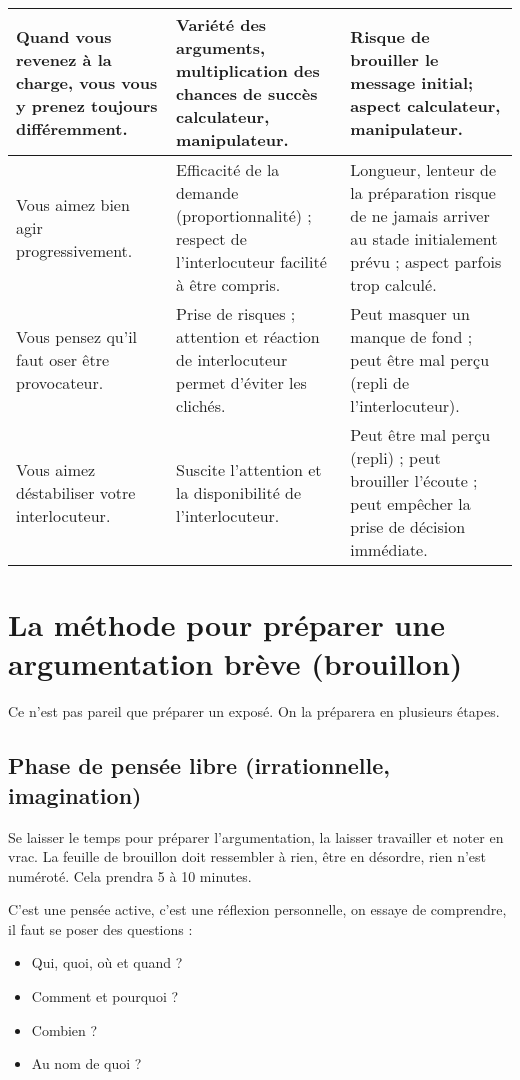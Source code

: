 \documentclass[final, a4paper, 11pt]{article}
\begin{document}
\begin{tabular}{|p{4cm}|p{6cm}|p{6cm}|}
Quand vous revenez à la charge, vous vous y prenez toujours différemment.
& Variété des arguments, multiplication des chances de succès calculateur, manipulateur.
& Risque de brouiller le message initial; aspect calculateur, manipulateur.
\\\hline

Vous aimez bien agir progressivement. 
& Efficacité de la demande (proportionnalité) ; respect de l'interlocuteur facilité à être compris.
& Longueur, lenteur de la préparation risque de ne jamais arriver au stade initialement prévu ; aspect parfois trop calculé.
\\\hline

Vous pensez qu'il faut oser être provocateur.
& Prise de risques ; attention et réaction de interlocuteur permet d'éviter les clichés.
& Peut masquer un manque de fond ; peut être mal perçu (repli de l'interlocuteur).
\\\hline

Vous aimez déstabiliser votre interlocuteur.
& Suscite l'attention et la disponibilité de l'interlocuteur.
& Peut être mal perçu (repli) ; peut brouiller l'écoute ; peut empêcher la prise de décision immédiate.
\\\hline
\end{tabular}

\section{La méthode pour préparer une argumentation brève (brouillon)}
Ce n'est pas pareil que préparer un exposé. On la préparera en plusieurs étapes.

\subsection{Phase de pensée libre (irrationnelle, imagination)}
Se laisser le temps pour préparer l'argumentation, la laisser travailler et noter en vrac. La feuille de brouillon doit ressembler à rien, être en désordre, rien n'est numéroté. Cela prendra 5 à 10 minutes.

C'est une pensée active, c'est une réflexion personnelle, on essaye de comprendre, il faut se poser des questions :
\begin{itemize}
	\item Qui, quoi, où et quand ?
	\item Comment et pourquoi ?
	\item Combien ?
	\item Au nom de quoi ?
\end{itemize}
\end{document}

